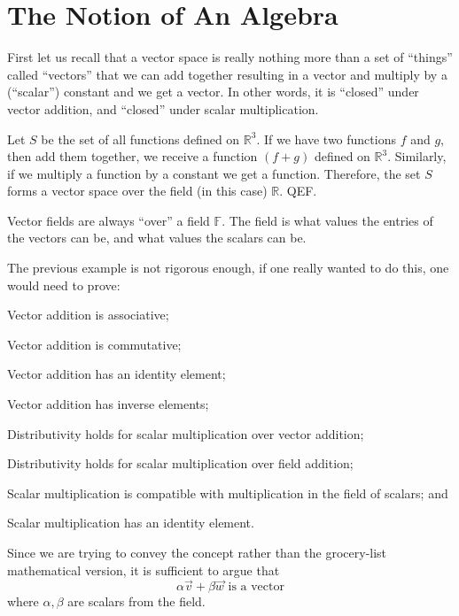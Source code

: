 \section{The Notion of An Algebra}

First let us recall that a vector space is really nothing more than a set of
``things'' called ``vectors'' that we can add together resulting in a vector and
multiply by a (``scalar'') constant and we get a vector. In other words, it is
``closed'' under vector addition, and ``closed'' under scalar multiplication.

\begin{ex}
Let $S$ be the set of all functions defined on $\mathbb{R}^3$. If we have two
functions $f$ and $g$, then add them together, we receive a function $(f+g)$
defined on $\mathbb{R}^3$. Similarly, if we multiply a function by a constant
we get a function. Therefore, the set $S$ forms a vector space over the field
(in this case) $\mathbb{R}$. QEF.
\end{ex}

\begin{rmk}
Vector fields are always ``over'' a field $\mathbb{F}$. The field is what
values the entries of the vectors can be, and what values the scalars can be.
\end{rmk}

\begin{rmk}
The previous example is not rigorous enough, if one really wanted to do this,
one would need to prove: \begin{inparaenum}
\item Vector addition is associative;
\item Vector addition is commutative;
\item Vector addition has an identity element;
\item Vector addition has inverse elements;
\item Distributivity holds for scalar multiplication over vector addition;
\item Distributivity holds for scalar multiplication over field addition;
\item Scalar multiplication is compatible with multiplication in the field of scalars; and 
\item Scalar multiplication has an identity element.
\end{inparaenum}
Since we are trying to convey the concept rather than the grocery-list mathematical version, it is sufficient to argue that
\begin{equation}
\alpha\vec{v}+\beta\vec{w}\textrm{ is a vector}
\end{equation}
where $\alpha,\beta$ are scalars from the field.
\end{rmk}

